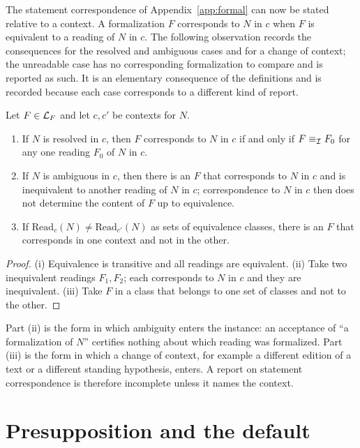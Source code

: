 The statement correspondence of Appendix~\ref{app:formal} can now be stated relative to a context. A formalization $F$ corresponds to $N$ in $c$ when $F$ is equivalent to a reading of $N$ in $c$. The following observation records the consequences for the resolved and ambiguous cases and for a change of context; the unreadable case has no corresponding formalization to compare and is reported as such. It is an elementary consequence of the definitions and is recorded because each case corresponds to a different kind of report.

\begin{proposition}
\label{prop:ctxrel}
Let $F \in \mathcal{L}_F$ and let $c, c'$ be contexts for $N$.
\begin{enumerate}[label=(\roman*)]
\item If $N$ is resolved in $c$, then $F$ corresponds to $N$ in $c$ if and only if $F \equiv_{\mathcal{I}} F_0$ for any one reading $F_0$ of $N$ in $c$.
\item If $N$ is ambiguous in $c$, then there is an $F$ that corresponds to $N$ in $c$ and is inequivalent to another reading of $N$ in $c$; correspondence to $N$ in $c$ then does not determine the content of $F$ up to equivalence.
\item If $\mathrm{Read}_c(N) \neq \mathrm{Read}_{c'}(N)$ as sets of equivalence classes, there is an $F$ that corresponds in one context and not in the other.
\end{enumerate}
\end{proposition}

\begin{proof}
(i) Equivalence is transitive and all readings are equivalent. (ii) Take two inequivalent readings $F_1, F_2$; each corresponds to $N$ in $c$ and they are inequivalent. (iii) Take $F$ in a class that belongs to one set of classes and not to the other.
\end{proof}

Part (ii) is the form in which ambiguity enters the instance: an acceptance of ``a formalization of $N$'' certifies nothing about which reading was formalized. Part (iii) is the form in which a change of context, for example a different edition of a text or a different standing hypothesis, enters. A report on statement correspondence is therefore incomplete unless it names the context.

\section{Presupposition and the default}

